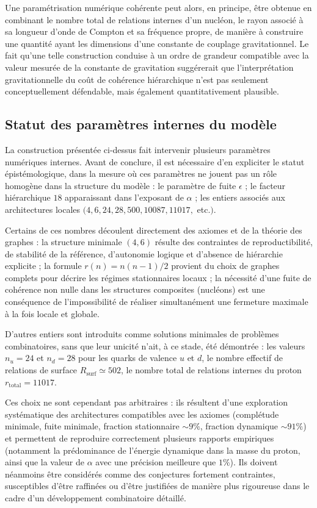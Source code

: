 \documentclass[11pt,a4paper]{article}
\begin{document}
Une paramétrisation numérique cohérente peut alors, en principe, être obtenue en combinant le nombre total de relations internes d’un nucléon, le rayon associé à sa longueur d’onde de Compton et sa fréquence propre, de manière à construire une quantité ayant les dimensions d’une constante de couplage gravitationnel. Le fait qu’une telle construction conduise à un ordre de grandeur compatible avec la valeur mesurée de la constante de gravitation suggérerait que l’interprétation gravitationnelle du coût de cohérence hiérarchique n’est pas seulement conceptuellement défendable, mais également quantitativement plausible.

\subsection{Statut des paramètres internes du modèle}

La construction présentée ci-dessus fait intervenir plusieurs paramètres numériques internes. Avant de conclure, il est nécessaire d’en expliciter le statut épistémologique, dans la mesure où ces paramètres ne jouent pas un rôle homogène dans la structure du modèle : 
le paramètre de fuite \(\epsilon\) ; 
le facteur hiérarchique \(18\) apparaissant dans l’exposant de \(\alpha\) ; 
les entiers associés aux architectures locales \((4, 6, 24, 28, 500, 10087, 11017,\) etc.\().\)

Certains de ces nombres découlent directement des axiomes et de la théorie des graphes : 
la structure minimale \(\left(4,6\right)\) résulte des contraintes de reproductibilité, de stabilité de la référence, d’autonomie logique et d’absence de hiérarchie explicite ; 
la formule \(r\left(n\right) = n\left(n-1\right)/2\) provient du choix de graphes complets pour décrire les régimes stationnaires locaux ; 
la nécessité d’une fuite de cohérence non nulle dans les structures composites (nucléons) est une conséquence de l’impossibilité de réaliser simultanément une fermeture maximale à la fois locale et globale.

D’autres entiers sont introduits comme solutions minimales de problèmes combinatoires, sans que leur unicité n’ait, à ce stade, été démontrée : 
les valeurs \(n_u = 24\) et \(n_d = 28\) pour les quarks de valence \(u\) et \(d\),  
le nombre effectif de relations de surface \(R_{\mathrm{surf}} \simeq 502\),  
le nombre total de relations internes du proton \(r_{\mathrm{total}} = 11017\).

Ces choix ne sont cependant pas arbitraires : ils résultent d’une exploration systématique des architectures compatibles avec les axiomes (complétude minimale, fuite minimale, fraction stationnaire \(\sim 9\%\), fraction dynamique \(\sim 91\%\)) et permettent de reproduire correctement plusieurs rapports empiriques (notamment la prédominance de l’énergie dynamique dans la masse du proton, ainsi que la valeur de \(\alpha\) avec une précision meilleure que \(1\%\)).  
Ils doivent néanmoins être considérés comme des conjectures fortement contraintes, susceptibles d’être raffinées ou d’être justifiées de manière plus rigoureuse dans le cadre d’un développement combinatoire détaillé.
\end{document}
